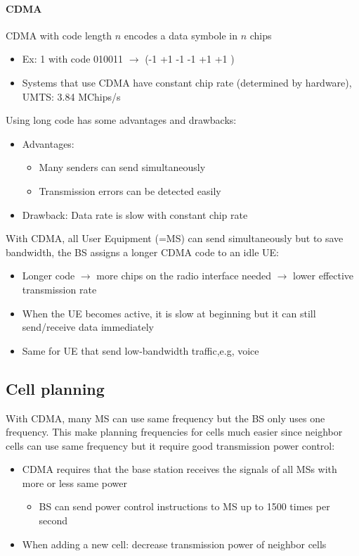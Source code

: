\paragraph{CDMA}
CDMA with code length $n$ encodes a data symbole in $n$ chips
\begin{itemize}
	\item Ex: 1 with code 010011 $\to$ (-1 +1 -1 -1 +1 +1 )
	\item Systems that use CDMA have constant chip rate (determined by hardware),
	UMTS: 3.84 MChips/s
\end{itemize}
Using long code has some advantages and drawbacks:
\begin{itemize}
	\item Advantages:
	\begin{itemize}
		\item Many senders can send simultaneously
		\item Transmission errors can be detected easily
	\end{itemize}
	\item Drawback: Data rate is slow with constant chip rate
\end{itemize}
With CDMA, all User Equipment (=MS) can send simultaneously but to save
bandwidth, the BS assigns a longer CDMA code to an idle UE:
\begin{itemize}
	\item Longer code $\to$ more chips on the radio interface needed
	$\to$ lower effective transmission rate
	\item When the UE becomes active, it is slow at beginning but it can still
	send/receive data immediately 
	\item Same for UE that send low-bandwidth traffic,e.g, voice
\end{itemize}

\subsection{Cell planning}
With CDMA, many MS can use same frequency but the BS only uses one frequency.
This make planning frequencies for cells much easier since neighbor cells can use
same frequency but it require good transmission power control:
\begin{itemize}
	\item CDMA requires that the base station receives the signals 
	of all MSs with more or less same power
	\begin{itemize}
		\item BS can send power control instructions to MS up to
		1500 times per second
	\end{itemize}
	\item When adding a new cell: decrease transmission power of neighbor cells
\end{itemize}

